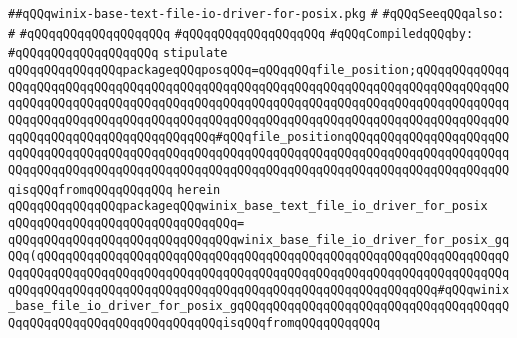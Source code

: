 \label{src/lib/std/src/io/winix-base-text-file-io-driver-for-posix.pkg}
\verb|##qQQqwinix-base-text-file-io-driver-for-posix.pkg|\newline
\verb|#|\newline
\verb|#qQQqSeeqQQqalso:|\newline
\verb|#|\newline
\verb|#qQQqqQQqqQQqqQQqqQQq|\newline
\verb|#qQQqqQQqqQQqqQQqqQQq|\newline
\newline
\verb|#qQQqCompiledqQQqby:|\newline
\verb|#qQQqqQQqqQQqqQQqqQQq|\newline
\newline
\newline
\verb|stipulate|\newline
\verb|qQQqqQQqqQQqqQQqpackageqQQqposqQQq=qQQqqQQqfile_position;qQQqqQQqqQQqqQQqqQQqqQQqqQQqqQQqqQQqqQQqqQQqqQQqqQQqqQQqqQQqqQQqqQQqqQQqqQQqqQQqqQQqqQQqqQQqqQQqqQQqqQQqqQQqqQQqqQQqqQQqqQQqqQQqqQQqqQQqqQQqqQQqqQQqqQQqqQQqqQQqqQQqqQQqqQQqqQQqqQQqqQQqqQQqqQQqqQQqqQQqqQQqqQQqqQQqqQQqqQQqqQQqqQQqqQQqqQQqqQQqqQQqqQQqqQQq#qQQqfile_positionqQQqqQQqqQQqqQQqqQQqqQQqqQQqqQQqqQQqqQQqqQQqqQQqqQQqqQQqqQQqqQQqqQQqqQQqqQQqqQQqqQQqqQQqqQQqqQQqqQQqqQQqqQQqqQQqqQQqqQQqqQQqqQQqqQQqqQQqqQQqqQQqqQQqqQQqqQQqqQQqqQQqisqQQqfromqQQqqQQqqQQq|\newline
\verb|herein|\newline
\verb|qQQqqQQqqQQqqQQqpackageqQQqwinix_base_text_file_io_driver_for_posix|\newline
\verb|qQQqqQQqqQQqqQQqqQQqqQQqqQQqqQQq=|\newline
\verb|qQQqqQQqqQQqqQQqqQQqqQQqqQQqqQQqwinix_base_file_io_driver_for_posix_gqQQq(qQQqqQQqqQQqqQQqqQQqqQQqqQQqqQQqqQQqqQQqqQQqqQQqqQQqqQQqqQQqqQQqqQQqqQQqqQQqqQQqqQQqqQQqqQQqqQQqqQQqqQQqqQQqqQQqqQQqqQQqqQQqqQQqqQQqqQQqqQQqqQQqqQQqqQQqqQQqqQQqqQQqqQQqqQQqqQQqqQQqqQQqqQQqqQQqqQQq#qQQqwinix_base_file_io_driver_for_posix_gqQQqqQQqqQQqqQQqqQQqqQQqqQQqqQQqqQQqqQQqqQQqqQQqqQQqqQQqqQQqqQQqqQQqisqQQqfromqQQqqQQqqQQq|\newline
